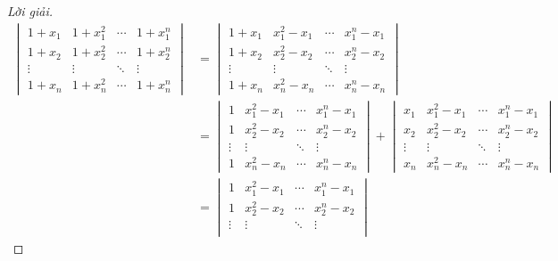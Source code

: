 \documentclass[class=linear-algebra,crop=false]{standalone}
\begin{document}
\begin{proof}[Lời giải]
	\begingroup{}
	\allowdisplaybreaks{}
	\begin{align*}
		\begin{vmatrix}
			1 + x_{1} & 1 + x_{1}^{2} & \cdots & 1 + x_{1}^{n} \\
			1 + x_{2} & 1 + x_{2}^{2} & \cdots & 1 + x_{2}^{n} \\
			\vdots    & \vdots        & \ddots & \vdots        \\
			1 + x_{n} & 1 + x_{n}^{2} & \cdots & 1 + x_{n}^{n}
		\end{vmatrix}
		 & =
		\begin{vmatrix}
			1 + x_{1} & x_{1}^{2} - x_{1} & \cdots & x_{1}^{n} - x_{1} \\
			1 + x_{2} & x_{2}^{2} - x_{2} & \cdots & x_{2}^{n} - x_{2} \\
			\vdots    & \vdots            & \ddots & \vdots            \\
			1 + x_{n} & x_{n}^{2} - x_{n} & \cdots & x_{n}^{n} - x_{n}
		\end{vmatrix}                                   \\
		 & =
		\begin{vmatrix}
			1      & x_{1}^{2} - x_{1} & \cdots & x_{1}^{n} - x_{1} \\
			1      & x_{2}^{2} - x_{2} & \cdots & x_{2}^{n} - x_{2} \\
			\vdots & \vdots            & \ddots & \vdots            \\
			1      & x_{n}^{2} - x_{n} & \cdots & x_{n}^{n} - x_{n}
		\end{vmatrix}
		+
		\begin{vmatrix}
			x_{1}  & x_{1}^{2} - x_{1} & \cdots & x_{1}^{n} - x_{1} \\
			x_{2}  & x_{2}^{2} - x_{2} & \cdots & x_{2}^{n} - x_{2} \\
			\vdots & \vdots            & \ddots & \vdots            \\
			x_{n}  & x_{n}^{2} - x_{n} & \cdots & x_{n}^{n} - x_{n}
		\end{vmatrix}                                      \\
		 & =
		\begin{vmatrix}
			1      & x_{1}^{2} - x_{1} & \cdots & x_{1}^{n} - x_{1} \\
			1      & x_{2}^{2} - x_{2} & \cdots & x_{2}^{n} - x_{2} \\
			\vdots & \vdots            & \ddots & \vdots            \\

\end{vmatrix}
\end{align*}
\end{proof}
\end{document}
